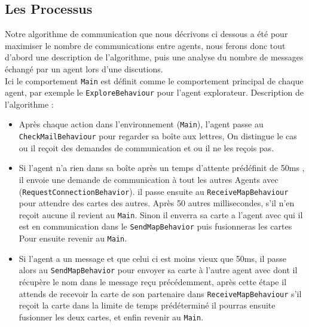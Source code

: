 \documentclass[10pt]{article}
\newcommand\tab[1][0.65cm]{\hspace*{#1}}
\begin{document}
\subsection{Les Processus}
Notre algorithme de communication que nous décrivons ci dessous a été  pour maximiser le nombre de communications entre agents, nous ferons donc tout d'abord une description de l'algorithme, puis une analyse du nombre de messages échangé par un agent lors d'une discutions.\\
\linebreak   
\tab Ici le comportement \texttt{Main} est définit comme le comportement principal de chaque agent, par exemple le \texttt{ExploreBehaviour} pour l'agent explorateur. 
Description de l'algorithme :
\begin{itemize}
\item Après chaque action dans l'environnement (\texttt{Main}), l'agent passe au \texttt{CheckMailBehaviour} pour regarder sa boîte aux lettres, On distingue le cas ou il reçoit des demandes de communication  et ou il ne les reçois pas.

\item Si l'agent n'a rien dans sa boîte après un temps d'attente prédéfinit de 50ms , il envoie une demande de communication à tout les autres Agents avec (\texttt{RequestConnectionBehavior}). il passe ensuite au \texttt{ReceiveMapBehaviour} pour attendre des cartes des autres. Après 50 autres millisecondes, s'il n'en reçoit aucune il revient au \texttt{Main}. Sinon il enverra sa carte a l'agent avec qui il est en communication dans le \texttt{SendMapBehavior} puis fusionneras les cartes Pour ensuite revenir au \texttt{Main}.

\item Si l'agent a un message et que celui ci est moins vieux que 50ms, il passe alors au \texttt{SendMapBehavior} pour envoyer sa carte à l'autre agent avec dont il récupère le nom dans le message reçu précédemment, après cette étape il attends de recevoir la carte de son partenaire dans \texttt{ReceiveMapBehaviour} s'il reçoit la carte dans la limite de temps prédéterminé il pourras ensuite fusionner les deux cartes, et enfin revenir au \texttt{Main}.\\

\end{itemize}
\end{document}

